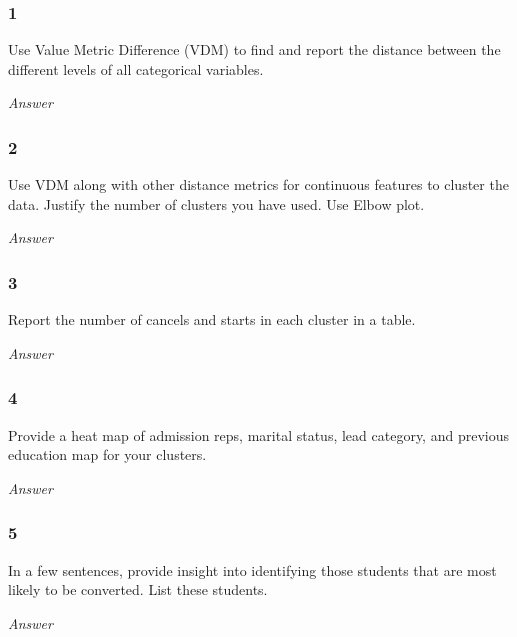 \documentclass[11pt]{article}
\begin{document}
\hypertarget{section}{%
\subsubsection{1}\label{section}}

Use Value Metric Difference (VDM) to find and report the distance
between the different levels of all categorical variables.

\emph{Answer}

    \hypertarget{section}{%
\subsubsection{2}\label{section}}

Use VDM along with other distance metrics for continuous features to
cluster the data. Justify the number of clusters you have used. Use
Elbow plot.

\emph{Answer}

    \hypertarget{section}{%
\subsubsection{3}\label{section}}

Report the number of cancels and starts in each cluster in a table.

\emph{Answer}

    \hypertarget{section}{%
\subsubsection{4}\label{section}}

Provide a heat map of admission reps, marital status, lead category, and
previous education map for your clusters.

\emph{Answer}

    \hypertarget{section}{%
\subsubsection{5}\label{section}}

In a few sentences, provide insight into identifying those students that
are most likely to be converted. List these students.

\emph{Answer}


    
    
    
    
\end{document}
